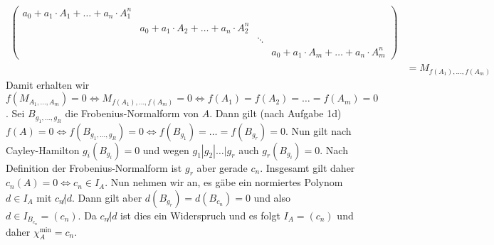 \documentclass{article}
\theoremstyle{definition}
\newcommand{\equals}{\Longleftrightarrow}
\begin{document}
\begin{enumerate}[(a)]
\begin{align*}
\begin{pmatrix}
                  a_0 + a_1\cdot A_1 + \dots + a_n\cdot A_1^n &                                             &        &                                             \\
                                                              & a_0 + a_1\cdot A_2 + \dots + a_n\cdot A_2^n &        &                                             \\
                                                              &                                             & \ddots &                                             \\
                                                              &                                             &        & a_0 + a_1\cdot A_m + \dots + a_n\cdot A_m^n
              \end{pmatrix}                                                               \\
                                   & = M_{f(A_1), \dots, f(A_m)}
          \end{align*}
          Damit erhalten wir $f(M_{A_1,\dots,A_m}) = 0 \equals M_{f(A_1), \dots, f(A_m)} = 0 \equals f(A_1) = f(A_2) = \dots = f(A_m) = 0$. Sei $B_{g_1,\dots, g_R}$ die Frobenius-Normalform von $A$. Dann gilt (nach Aufgabe 1d) $f(A) = 0 \equals f(B_{g_1,\dots, g_R}) = 0 \equals f(B_{g_1}) = \dots = f(B_{g_r}) = 0$. Nun gilt nach Cayley-Hamilton $g_i(B_{g_i}) = 0$ und wegen $g_1 | g_2 | \dots | g_r$ auch $g_r(B_{g_i}) = 0$. Nach Definition der Frobenius-Normalform ist $g_r$ aber gerade $c_n$. Insgesamt  gilt daher $c_n(A) = 0 \equals c_n\in I_A$. Nun nehmen wir an, es gäbe ein normiertes Polynom $d\in I_A$ mit $c_n \not | d$. Dann gilt aber $d(B_{g_r}) = d(B_{c_n}) = 0$ und also $d\in I_{B_{c_n}} = (c_n)$. Da $c_n \not | d$ ist dies ein Widerspruch und es folgt $I_A = (c_n)$ und daher $\chi^\text{min}_A = c_n$.
\end{enumerate}
\end{document}
